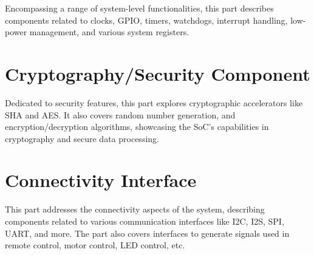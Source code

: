\documentclass[openany, 10pt]{book}
\begin{document}

Encompassing a range of system-level functionalities, this part describes components related to clocks, GPIO, timers, watchdogs, interrupt handling, low-power management, and various system registers.



\part{Cryptography/Security Component}

Dedicated to security features, this part explores cryptographic accelerators like SHA and AES. It also covers random number generation, and encryption/decryption algorithms, showcasing the SoC's capabilities in cryptography and secure data processing.






\part{Connectivity Interface}


This part addresses the connectivity aspects of the system, describing components related to various communication interfaces like I2C, I2S, SPI, UART, and more. The part also covers interfaces to generate signals used in remote control, motor control, LED control, etc.

\end{document}
